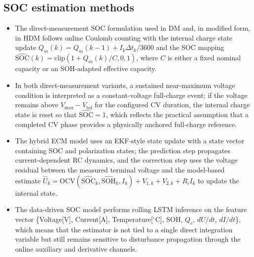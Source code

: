 \documentclass[review,nopreprintline]{elsarticle}
\begin{document}
\subsection{SOC estimation methods}
\begin{itemize}[leftmargin=*]
    \item The direct-measurement SOC formulation used in DM and, in modified form, in HDM follows online Coulomb counting with the internal charge state update $Q_m(k)=Q_m(k-1)+I_k \Delta t_k / 3600$ and the SOC mapping $\widehat{\mathrm{SOC}}(k)=\mathrm{clip}\!\left(1+Q_m(k)/C,0,1\right)$, where $C$ is either a fixed nominal capacity or an SOH-adapted effective capacity.
    \item In both direct-measurement variants, a sustained near-maximum voltage condition is interpreted as a constant-voltage full-charge event; if the voltage remains above $V_{\max}-V_{\mathrm{tol}}$ for the configured CV duration, the internal charge state is reset so that $\widehat{\mathrm{SOC}}=1$, which reflects the practical assumption that a completed CV phase provides a physically anchored full-charge reference.
    \item The hybrid ECM model uses an EKF-style state update with a state vector containing SOC and polarization states; the prediction step propagates current-dependent RC dynamics, and the correction step uses the voltage residual between the measured terminal voltage and the model-based estimate $\widehat{U}_k = \mathrm{OCV}(\widehat{\mathrm{SOC}}_k,\widehat{\mathrm{SOH}}_k,I_k) + V_{1,k} + V_{2,k} + R_i I_k$ to update the internal state.
    \item The data-driven SOC model performs rolling LSTM inference on the feature vector \{Voltage[V], Current[A], Temperature[$^\circ$C], SOH, $Q_c$, $dU/dt$, $dI/dt$\}, which means that the estimator is not tied to a single direct integration variable but still remains sensitive to disturbance propagation through the online auxiliary and derivative channels.
\end{itemize}
\end{document}
